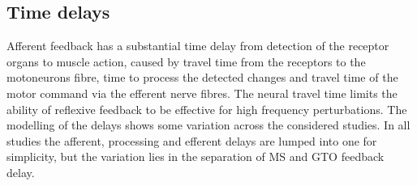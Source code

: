 




\subsection{Time delays}
\label{sec:ass_afferent_delay}
Afferent feedback has a substantial time delay from detection of the receptor organs to muscle action, caused by travel time from the receptors to the motoneurons fibre, time to process the detected changes and travel time of the motor command via the efferent nerve fibres. The neural travel time limits the ability of reflexive feedback to be effective for high frequency perturbations. The modelling of the delays shows some variation across the considered studies. In all studies the afferent, processing and efferent delays are lumped into one for simplicity, but the variation lies in the separation of MS and GTO feedback delay.

